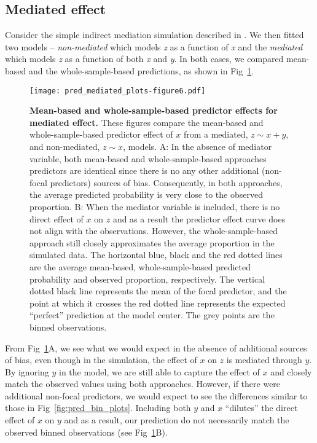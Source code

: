 \documentclass[10pt,letterpaper]{article}
\begin{document}
\subsection*{Mediated effect}

Consider the simple indirect mediation simulation described in . We then fitted two models -- \emph{non-mediated} which models \emph{z} as a function of \emph{x} and the \emph{mediated} which models \emph{z} as a function of both \emph{x} and \emph{y}. In both cases, we compared mean-based and the whole-sample-based predictions, as shown in Fig~\ref{fig:pred_mediated_plots}.

\begin{figure}[!h]
\centering
\texttt{[image: pred\_mediated\_plots-figure6.pdf]}
\caption{{\bf Mean-based and whole-sample-based predictor effects for mediated effect.} These figures compare the mean-based and whole-sample-based predictor effect of $x$ from a mediated, $z \sim x + y$, and non-mediated, $z \sim x$, models. A: In the absence of mediator variable, both mean-based and whole-sample-based approaches predictors are identical since there is no any other additional (non-focal predictors) sources of bias. Consequently, in both approaches, the average predicted probability is very close to the observed proportion. B: When the mediator variable is included, there is no direct effect of $x$ on $z$ and as a result the predictor effect curve does not align with the observations. However, the whole-sample-based approach still closely approximates the average proportion in the simulated data. The horizontal blue, black and the red dotted lines are the average mean-based, whole-sample-based predicted probability and observed proportion, respectively. The vertical dotted black line represents the mean of the focal predictor, and the point at which it crosses the red dotted line represents the expected ``perfect'' prediction at the model center. The grey points are the binned observations.}
\label{fig:pred_mediated_plots}
\end{figure}

From Fig~\ref{fig:pred_mediated_plots}A, we see what we would expect in the absence of additional sources of bias, even though in the simulation, the effect of $x$ on $z$ is mediated through $y$. By ignoring $y$ in the model, we are still able to capture the effect of $x$ and closely match the observed values using both approaches. However, if there were additional non-focal predictors, we would expect to see the differences similar to those in Fig~\ref{fig:pred_bin_plots}. Including both $y$ and $x$ ``dilutes'' the direct effect of $x$ on $y$ and as a result, our prediction do not necessarily match the observed binned observations (see Fig~\ref{fig:pred_mediated_plots}B).
\end{document}
